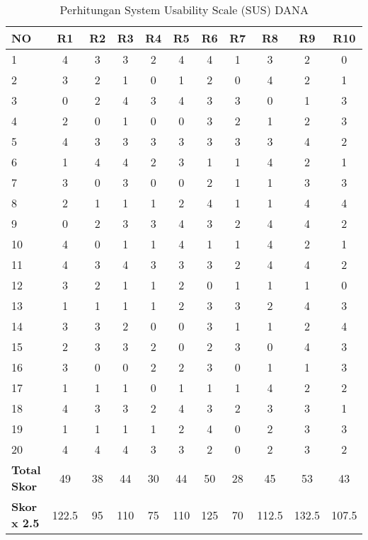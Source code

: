 \begin{table}[hbt!]
    \begin{threeparttable}
        \caption{Perhitungan System Usability Scale (SUS) DANA}
        \label{tabel:sus_dana}
        \begin{tabular}{l*{10}{c}}
            \toprule
            \textbf{NO} & \textbf{R1} & \textbf{R2} & \textbf{R3} & \textbf{R4} & \textbf{R5} & \textbf{R6} & \textbf{R7} & \textbf{R8} & \textbf{R9} & \textbf{R10} \\
            \midrule
            1  & 4 & 3 & 3 & 2 & 4 & 4 & 1 & 3 & 2 & 0 \\
            \hline
            2  & 3 & 2 & 1 & 0 & 1 & 2 & 0 & 4 & 2 & 1 \\
            \hline
            3  & 0 & 2 & 4 & 3 & 4 & 3 & 3 & 0 & 1 & 3 \\
            \hline
            4  & 2 & 0 & 1 & 0 & 0 & 3 & 2 & 1 & 2 & 3 \\
            \hline
            5  & 4 & 3 & 3 & 3 & 3 & 3 & 3 & 3 & 4 & 2 \\
            \hline
            6  & 1 & 4 & 4 & 2 & 3 & 1 & 1 & 4 & 2 & 1 \\
            \hline
            7  & 3 & 0 & 3 & 0 & 0 & 2 & 1 & 1 & 3 & 3 \\
            \hline
            8  & 2 & 1 & 1 & 1 & 2 & 4 & 1 & 1 & 4 & 4 \\
            \hline
            9  & 0 & 2 & 3 & 3 & 4 & 3 & 2 & 4 & 4 & 2 \\
            \hline
            10 & 4 & 0 & 1 & 1 & 4 & 1 & 1 & 4 & 2 & 1 \\
            \hline
            11 & 4 & 3 & 4 & 3 & 3 & 3 & 2 & 4 & 4 & 2 \\
            \hline
            12 & 3 & 2 & 1 & 1 & 2 & 0 & 1 & 1 & 1 & 0 \\
            \hline
            13 & 1 & 1 & 1 & 1 & 2 & 3 & 3 & 2 & 4 & 3 \\
            \hline
            14 & 3 & 3 & 2 & 0 & 0 & 3 & 1 & 1 & 2 & 4 \\
            \hline
            15 & 2 & 3 & 3 & 2 & 0 & 2 & 3 & 0 & 4 & 3 \\
            \hline
            16 & 3 & 0 & 0 & 2 & 2 & 3 & 0 & 1 & 1 & 3 \\
            \hline
            17 & 1 & 1 & 1 & 0 & 1 & 1 & 1 & 4 & 2 & 2 \\
            \hline
            18 & 4 & 3 & 3 & 2 & 4 & 3 & 2 & 3 & 3 & 1 \\
            \hline
            19 & 1 & 1 & 1 & 1 & 2 & 4 & 0 & 2 & 3 & 3 \\
            \hline
            20 & 4 & 4 & 4 & 3 & 3 & 2 & 0 & 2 & 3 & 2 \\
            \midrule
            \textbf{Total Skor}   & 49 & 38 & 44 & 30 & 44 & 50 & 28 & 45 & 53 & 43 \\
            \hline
            \textbf{Skor x 2.5}   & 122.5 & 95 & 110 & 75 & 110 & 125 & 70 & 112.5 & 132.5 & 107.5 \\
            \bottomrule
        \end{tabular}
    \end{threeparttable}
\end{table}
